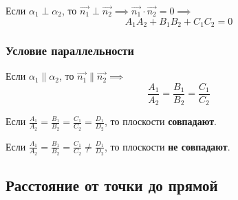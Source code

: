 Если $\alpha_1 \perp \alpha_2$, то $\vec{n_1} \perp \vec{n_2} \implies \vec{n_1} \cdot \vec{n_2} = 0 \implies$ \[
  \boxed{A_1 A_2 + B_1 B_2 + C_1 C_2 = 0}
\]

\subsubsection{Условие параллельности}

Если $\alpha_1 \parallel \alpha_2$, то $\vec{n_1} \parallel \vec{n_2} \implies$ \[
  \boxed{\frac{A_1}{A_2} = \frac{B_1}{B_2} = \frac{C_1}{C_2}}
\]

\begin{note}
  Если $\frac{A_1}{A_2} = \frac{B_1}{B_2} = \frac{C_1}{C_2} = \frac{D_1}{D_2}$, то плоскости \textbf{совпадают}.
\end{note}
\begin{note}
  Если $\frac{A_1}{A_2} = \frac{B_1}{B_2} = \frac{C_1}{C_2} \neq \frac{D_1}{D_2}$, то плоскости \textbf{не совпадают}.
\end{note}

\subsection{Расстояние от точки до прямой}

